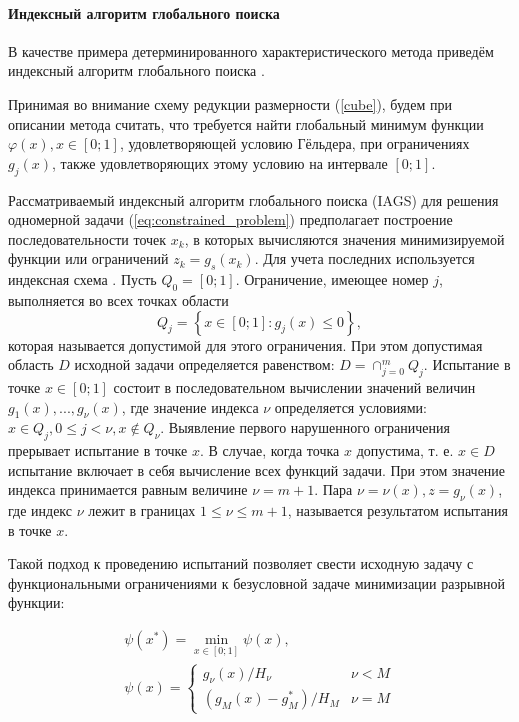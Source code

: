\paragraph{Индексный алгоритм глобального поиска}
В качестве примера детерминированного характеристического метода приведём индексный алгоритм глобального поиска \cite{Strongin2000}.

Принимая во внимание схему редукции размерности (\ref{cube}), будем при описании метода считать, что
требуется найти глобальный минимум функции \(\varphi(x), x\in[0;1]\),
удовлетворяющей условию Гёльдера, при ограничениях \(g_j(x)\), также
удовлетворяющих этому условию на интервале \([0;1]\).

Рассматриваемый индексный алгоритм глобального поиска (IAGS) для решения
одномерной задачи (\ref{eq:constrained_problem}) предполагает построение последовательности
точек \(x_k\), в которых вычисляются значения минимизируемой функции или ограничений \(z_k = g_s(x_k)\).
Для учета последних используется индексная схема \cite{Strongin2000}. Пусть \(Q_0=[0;1]\). Ограничение, имеющее номер
 \(j\), выполняется во всех точках области
\begin{displaymath}
  Q_j=\left\{x\in [0;1]:g_j(x)\leq 0\right\},
\end{displaymath}
которая называется допустимой для этого ограничения. При этом допустимая область \(D\)
исходной задачи определяется равенством: \(D=\cap _{j=0}^{m}Q_{j}\).
Испытание в точке \(x\in [0;1]\) состоит в последовательном вычислении значений
величин \(g_{1}(x),...,g_{\nu }(x)\), где значение индекса \(\nu\) определяется условиями:
\(x\in Q_{j},0\leqslant j<\nu ,x\notin Q_{\nu }\). Выявление первого нарушенного ограничения
прерывает испытание в точке \(x\). В случае, когда точка \(x\)  допустима, т. е.
\(x\in D\) испытание включает в себя вычисление всех функций задачи. При этом значение
индекса принимается равным величине \(\nu =m+1\). Пара \(\nu =\nu (x),z=g_{\nu }(x)\),
где индекс \(\nu\) лежит в границах \(1\leqslant \nu \leqslant m+1\), называется результатом
испытания в точке \(x\).

Такой подход к проведению испытаний позволяет свести исходную задачу с функциональными
ограничениями к безусловной задаче минимизации разрывной функции:

\begin{displaymath}
  \begin{array}{lr}
    \psi (x^{*})=\min_{x\in [0;1]}\psi (x), \\
    \psi (x)={\begin{cases}g_{\nu }(x)/H_{\nu }&\nu <M\\(g_{M}(x)-g_{M}^{*})/H_{M}&\nu =M\end{cases}}
  \end{array}
\end{displaymath}

